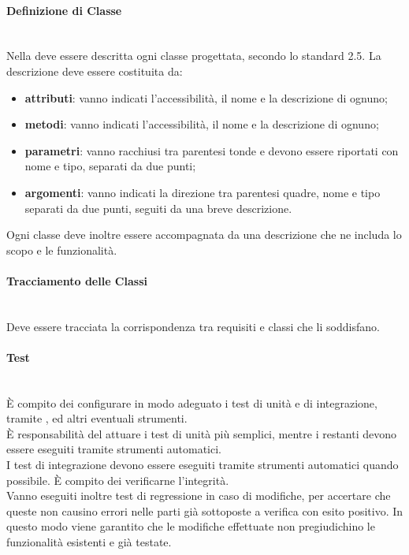 \paragraph{Definizione di Classe}\mbox{}\\
Nella \DefinizioneDiProdotto{} deve essere descritta ogni classe progettata, secondo lo standard  2.5. La descrizione deve essere costituita da:
\begin{itemize}
	\item \textbf{attributi}: vanno indicati l'accessibilità, il nome e la descrizione di ognuno;
	\item \textbf{metodi}: vanno indicati l'accessibilità, il nome e la descrizione di ognuno;
	\item \textbf{parametri}: vanno racchiusi tra parentesi tonde e devono essere riportati con nome e tipo, separati da due punti;
	\item \textbf{argomenti}: vanno indicati la direzione tra parentesi quadre, nome e tipo separati da due punti, seguiti da una breve descrizione.
\end{itemize}
Ogni classe deve inoltre essere accompagnata da una descrizione che ne includa lo scopo e le funzionalità.

\paragraph{Tracciamento delle Classi}\mbox{}\\
Deve essere tracciata la corrispondenza tra requisiti e classi che li soddisfano.

\paragraph{Test}\mbox{}\\
\`{E} compito dei \Progettisti{} configurare in modo adeguato i test di unità e di integrazione, tramite ,  ed altri eventuali strumenti.\\
\`{E} responsabilità del \Programmatore{} attuare i test di unità più semplici, mentre i restanti devono essere eseguiti tramite strumenti automatici.\\
I test di integrazione devono essere eseguiti tramite strumenti automatici quando possibile. \`{E} compito dei \Verificatori{} verificarne l'integrità.\\
Vanno eseguiti inoltre test di regressione in caso di modifiche, per accertare che queste non causino errori nelle parti già sottoposte a verifica con esito positivo. In questo modo viene garantito che le modifiche effettuate non pregiudichino le funzionalità esistenti e già testate.


